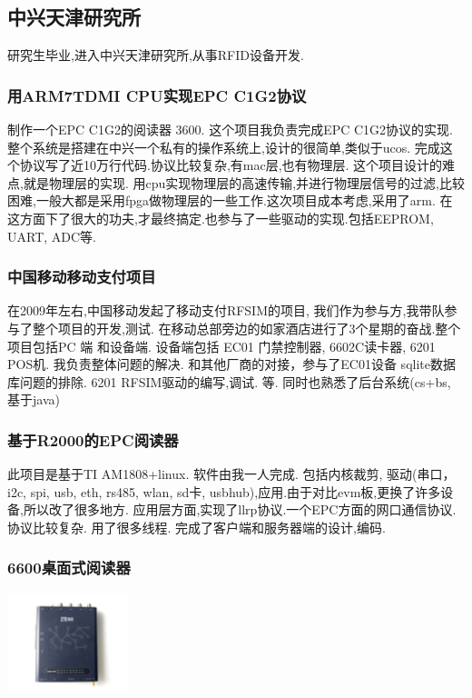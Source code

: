 \documentclass[titlepage]{article}
\begin{document}
\subsection{中兴天津研究所}

研究生毕业,进入中兴天津研究所,从事RFID设备开发.

\subsubsection{用ARM7TDMI CPU实现EPC C1G2协议}
制作一个EPC C1G2的阅读器 3600. 这个项目我负责完成EPC C1G2协议的实现.整个系统是搭建在中兴一个私有的操作系统上,设计的很简单,类似于ucos. 完成这个协议写了近10万行代码.协议比较复杂,有mac层,也有物理层. 这个项目设计的难点,就是物理层的实现. 用cpu实现物理层的高速传输,并进行物理层信号的过滤,比较困难,一般大都是采用fpga做物理层的一些工作.这次项目成本考虑,采用了arm. 在这方面下了很大的功夫,才最终搞定.也参与了一些驱动的实现.包括EEPROM, UART, ADC等.

\subsubsection{中国移动移动支付项目}
在2009年左右,中国移动发起了移动支付RFSIM的项目, 我们作为参与方,我带队参与了整个项目的开发,测试. 在移动总部旁边的如家酒店进行了3个星期的奋战.整个项目包括PC 端 和设备端. 设备端包括 EC01 门禁控制器, 6602C读卡器, 6201 POS机. 我负责整体问题的解决. 和其他厂商的对接，参与了EC01设备 sqlite数据库问题的排除. 6201 RFSIM驱动的编写,调试. 等. 同时也熟悉了后台系统(cs+bs, 基于java)

\subsubsection{基于R2000的EPC阅读器}
此项目是基于TI AM1808+linux. 软件由我一人完成. 包括内核裁剪, 驱动(串口，i2c, spi, usb, eth, rs485, wlan, sd卡, usbhub),应用.由于对比evm板,更换了许多设备,所以改了很多地方. 应用层方面,实现了llrp协议.一个EPC方面的网口通信协议. 协议比较复杂. 用了很多线程. 完成了客户端和服务器端的设计,编码.


\subsubsection{6600桌面式阅读器}
 
\includegraphics[width=100pt]{6600.png}
\end{document}
